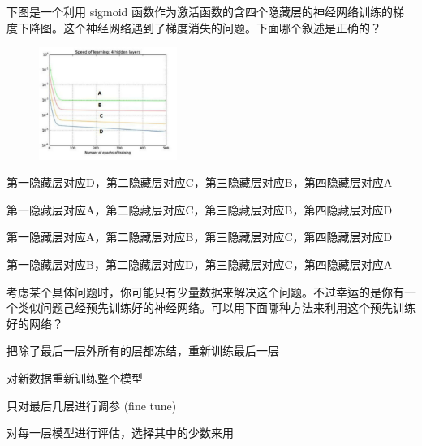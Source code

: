 \documentclass{exam-zh}
\begin{document}
\begin{question}
	下图是一个利用 sigmoid 函数作为激活函数的含四个隐藏层的神经网络训练的梯度下降图。这个神经网络遇到了梯度消失的问题。下面哪个叙述是正确的？\paren[A]
	\begin{figure}[htbp]
		\centering
		\includegraphics[width=0.4\textwidth]{./figure/fig2.png}
	\end{figure}
	\begin{choices}
		\item 第一隐藏层对应D，第二隐藏层对应C，第三隐藏层对应B，第四隐藏层对应A
		\item 第一隐藏层对应A，第二隐藏层对应C，第三隐藏层对应B，第四隐藏层对应D
		\item 第一隐藏层对应A，第二隐藏层对应B，第三隐藏层对应C，第四隐藏层对应D
		\item 第一隐藏层对应B，第二隐藏层对应D，第三隐藏层对应C，第四隐藏层对应A
	\end{choices}
\end{question}

\begin{question}
	考虑某个具体问题时，你可能只有少量数据来解决这个问题。不过幸运的是你有一个类似问题己经预先训练好的神经网络。可以用下面哪种方法来利用这个预先训练好的网络？\paren[C]
	\begin{choices}
		\item 把除了最后一层外所有的层都冻结，重新训练最后一层
		\item 对新数据重新训练整个模型
		\item 只对最后几层进行调参 (fine tune)
		\item 对每一层模型进行评估，选择其中的少数来用
	\end{choices}
\end{question}
\end{document}
